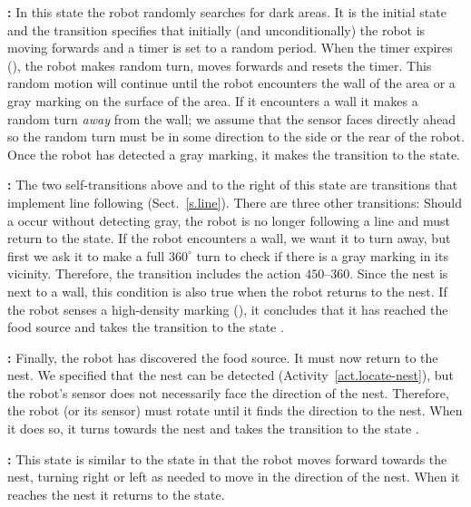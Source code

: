 \noindent\textbf{:} In this state the robot randomly searches for dark areas. It is the initial state and the transition  specifies that initially (and unconditionally) the robot is moving forwards and a timer is set to a random period. When the timer expires (), the robot makes random turn, moves forwards and resets the timer. This random motion will continue until the robot encounters the wall of the area or a gray marking on the surface of the area. If it encounters a wall it makes a random turn \emph{away} from the wall; we assume that the sensor faces directly ahead so the random turn must be in some direction to the side or the rear of the robot. Once the robot has detected a gray marking, it makes the transition to the  state.

\smallskip

\noindent\textbf{:} The two self-transitions above and to the right of this state are transitions that implement line following (Sect.~\ref{s.line}). There are three other transitions: Should a  occur without detecting gray, the robot is no longer following a line and must return to the  state. If the robot encounters a wall, we want it to turn away, but first we ask it to make a full $360^\circ$ turn to check if there is a gray marking in its vicinity. Therefore, the transition includes the action  $450$--$360$. Since the nest is next to a wall, this condition is also true when the robot returns to the nest. If the robot senses a high-density marking (), it concludes that it has reached the food source and takes the transition to the state .

\smallskip

\noindent\textbf{:} Finally, the robot has discovered the food source. It must now return to the nest. We specified that the nest can be detected (Activity~\ref{act.locate-nest}), but the robot's sensor does not necessarily face the direction of the nest. Therefore, the robot (or its sensor) must rotate until it finds the direction to the nest. When it does so, it turns towards the nest and takes the transition to the state .

\smallskip

\noindent\textbf{:} This state is similar to the  state in that the robot moves forward towards the nest, turning right or left as needed to move in the direction of the nest. When it reaches the nest it returns to the  state.

